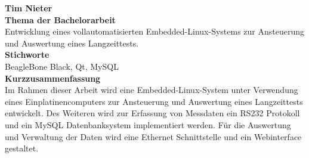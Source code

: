 
\thispagestyle{empty}


{\large \textbf{Tim Nieter}}\\

{\large \textbf{Thema der Bachelorarbeit}}\\
Entwicklung eines vollautomatisierten Embedded-Linux-Systems zur Ansteuerung und Auswertung eines Langzeittests.\\

{\large \textbf{Stichworte}}\\
BeagleBone Black, Qt, MySQL\\

{\large \textbf{Kurzzusammenfassung}}\\
Im Rahmen dieser Arbeit wird eine Embedded-Linux-System unter Verwendung eines Einplatinencomputers zur Ansteuerung und Auswertung eines Langzeittests entwickelt. Des Weiteren wird zur Erfassung von Messdaten ein RS232 Protokoll und ein MySQL Datenbanksystem implementiert werden. Für die Auswertung und Verwaltung der Daten wird eine Ethernet Schnittstelle und ein Webinterface gestaltet.